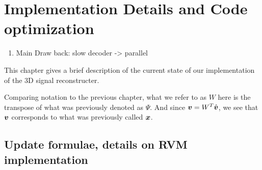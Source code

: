 \chapter{Implementation Details and Code optimization}
\begin{enumerate}
\item Main Draw back: slow decoder -> parallel
\end{enumerate}

This chapter gives a brief description of the current state of our implementation of the 3D signal reconstructer.

Comparing notation to the previous chapter, what we refer to as $W$ here is the transpose of what was previously denoted as $\Psi$.
And since $\boldsymbol v = W^T \hat{\boldsymbol v}$, we see that $\boldsymbol v$ corresponds to what was previously called $\boldsymbol x$. 

\section{Update formulae, details on RVM implementation}
